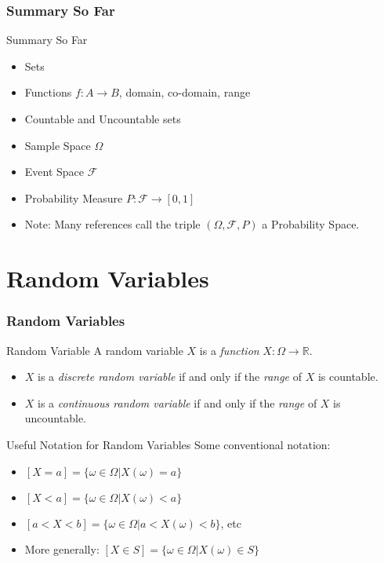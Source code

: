 \documentclass{beamer}
\begin{document}
\begin{frame}
  \frametitle{Summary So Far}
  \begin{block}{Summary So Far}
    \begin{itemize}
      \item<1-> Sets
      \item<2-> Functions $f: A \rightarrow B$, domain, co-domain, range
      \item<3-> Countable and Uncountable sets
      \item<4-> Sample Space $\Omega$
      \item<5-> Event Space $\mathscr{F}$
      \item<6-> Probability Measure $P: \mathscr{F} \rightarrow [0,1]$
      \item<6-> Note: Many references call the triple $(\Omega, \mathscr{F}, P)$ a Probability Space.
    \end{itemize}
  \end{block}
\end{frame}


\section{Random Variables}


\begin{frame}
  \frametitle{Random Variables}
  \begin{alertblock}{Random Variable \parencite[p.~143]{daners}}
    A random variable $X$ is a \emph{function} $X: \Omega \rightarrow \mathbb{R}$.
    \begin{itemize}
      \item<2-> $X$ is a \emph{discrete random variable} if and only if the \emph{range} of $X$ is countable.
      \item<3-> $X$ is a \emph{continuous random variable} if and only if the \emph{range} of $X$ is uncountable.
    \end{itemize}
  \end{alertblock}
  \pause\pause\pause
  \begin{block}{Useful Notation for Random Variables}
    Some conventional notation:
    \begin{itemize}
      \item<5-> $[X = a] = \{\omega \in \Omega | X(\omega) = a\}$
      \item<6-> $[X < a] = \{\omega \in \Omega | X(\omega) < a\}$
      \item<7-> $[a < X < b] = \{\omega \in \Omega | a < X(\omega) < b\}$, etc
      \item<8-> More generally: $[X \in S] = \{\omega \in \Omega | X(\omega) \in S\}$
    \end{itemize}
  \end{block}
\end{frame}
\end{document}
